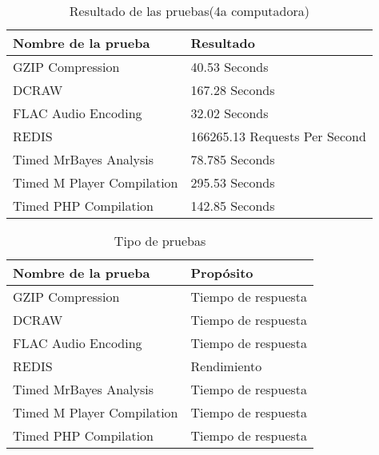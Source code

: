 \documentclass[12pt, letterpaper, twoside]{article}
\begin{document}
\begin{table}[H]
\begin{center}
\begin{tabular}{|l|l|}
\hline
Nombre de la prueba & Resultado \\
\hline \hline
GZIP Compression & 40.53 Seconds \\ \hline
DCRAW & 167.28 Seconds \\ \hline
FLAC Audio Encoding & 32.02 Seconds \\ \hline
REDIS & 166265.13 Requests Per Second \\ \hline
Timed MrBayes Analysis & 78.785 Seconds \\ \hline
Timed M Player Compilation & 295.53 Seconds \\ \hline
Timed PHP Compilation & 142.85 Seconds\\ \hline
\end{tabular}
\caption{Resultado de las pruebas(4a computadora)}
\label{tabla:sencilla}
\end{center}
\end{table}

\begin{table}[H]
\begin{center}
\begin{tabular}{|l|l|}
\hline
Nombre de la prueba & Propósito \\
\hline \hline
GZIP Compression &  Tiempo de respuesta\\ \hline
DCRAW & Tiempo de respuesta \\ \hline
FLAC Audio Encoding & Tiempo de respuesta \\ \hline
REDIS & Rendimiento \\ \hline
Timed MrBayes Analysis & Tiempo de respuesta \\ \hline
Timed M Player Compilation & Tiempo de respuesta \\ \hline
Timed PHP Compilation & Tiempo de respuesta \\ \hline
\end{tabular}
\caption{Tipo de pruebas}
\label{tabla:sencilla}
\end{center}
\end{table}
\end{document}
